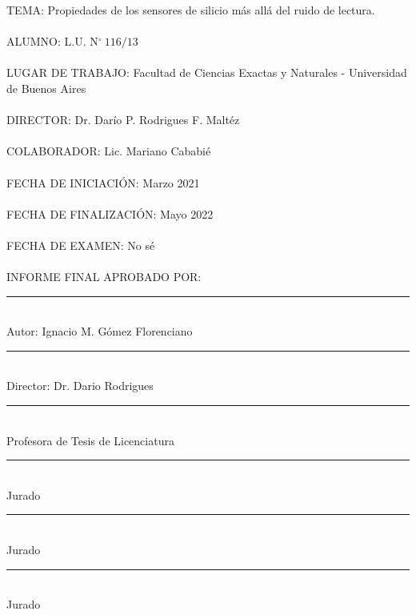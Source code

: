 \thispagestyle{empty}
\noindent TEMA: Propiedades de los sensores de silicio más allá del ruido de lectura.\\
\\
\noindent ALUMNO: L.U. N$^\circ\ 116/13$\\
\\
\noindent LUGAR DE TRABAJO: Facultad de Ciencias Exactas y Naturales - Universidad de Buenos Aires\\
\\
\noindent DIRECTOR: Dr. Darío P. Rodrigues F. Maltéz\\
\\
\noindent COLABORADOR: Lic. Mariano Cababié\\
\\
\noindent FECHA DE INICIACIÓN: Marzo 2021\\
\\
\noindent FECHA DE FINALIZACIÓN:  Mayo 2022\\
\\
\noindent FECHA DE EXAMEN: No sé\\
\\
\noindent INFORME FINAL APROBADO POR:\\
\vfill
\begin{multicols}{2}    
\rule[0pt]{2.5in}{0.5pt}\\
Autor: Ignacio M. Gómez Florenciano
\vspace{3em}

\rule[0pt]{2.5in}{0.5pt}\\
Director: Dr. Dario Rodrigues
\vspace{3em}
   
\rule[0pt]{2.5in}{0.5pt}\\
Profesora de Tesis de Licenciatura
    
\columnbreak
\rule[0pt]{2.5in}{0.5pt}\\
Jurado 
\vspace{3em}
    
\rule[0pt]{2.5in}{0.5pt}\\
Jurado 
\vspace{3em}
    
\rule[0pt]{2.5in}{0.5pt}\\
Jurado 
\end{multicols}  
\newpage
\thispagestyle{empty} \mbox{}
\thispagestyle{empty}
